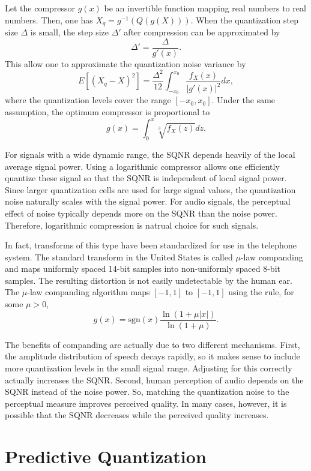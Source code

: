 Let the compressor $g(x)$ be an invertible function mapping real numbers to real numbers.
Then, one has $X_q = g^{-1} \left( Q \left( g(X) \right) \right)$.
When the quantization step size $\Delta$ is small, the step size $\Delta'$ after compression can be approximated by
\[ \Delta' = \frac{\Delta}{g'(x)}. \]
This allow one to approximate the quantization noise variance by
\[ E \left[ (X_q - X)^2 \right] = \frac{\Delta^2}{12} \int_{-x_0}^{x_0} \frac{f_X (x)}{|g'(x)|^2} dx, \]
where the quantization levels cover the range $[-x_0,x_0]$.
Under the same assumption, the optimum compressor is proportional to
\[ g(x) = \int_{0}^{x} \sqrt[3]{f_X (z)} dz . \]

For signals with a wide dynamic range, the SQNR depends heavily of the local average signal power.
Using a logarithmic compressor allows one efficiently quantize these signal so that the SQNR is independent of local signal power.
Since larger quantization cells are used for large signal values, the quantization noise naturally scales with the signal power.
For audio signals, the perceptual effect of noise typically depends more on the SQNR than the noise power.
Therefore, logarithmic compression is natrual choice for such signals.

In fact, transforms of this type have been standardized for use in the telephone system.
The standard transform in the United States is called $\mu$-law companding and maps uniformly spaced 14-bit samples into non-uniformly spaced 8-bit samples.
The resulting distortion is not easily undetectable by the human ear.
The $\mu$-law companding algorithm maps $[-1,1]$ to $[-1,1]$ using the rule, for some $\mu >0$,
\[ g(x) = \mathrm{sgn}(x)\frac{\ln \left( 1+ \mu |x| \right)}{\ln (1+\mu)}. \]

The benefits of companding are actually due to two different mechanisms.
First, the amplitude distribution of speech decays rapidly, so it makes sense to include more quantization levels in the small signal range.
Adjusting for this correctly actually increases the SQNR.
Second, human perception of audio depends on the SQNR instead of the noise power.
So, matching the quantization noise to the perceptual measure improves perceived quality.
In many cases, however, it is possible that the SQNR decreases while the perceived quality increases.

\section{Predictive Quantization}

